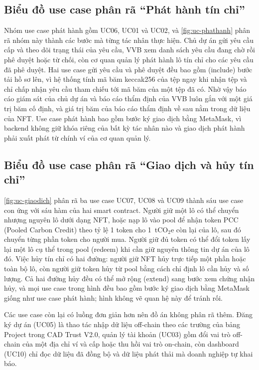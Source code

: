 \FloatBarrier
\subsection*{Biểu đồ use case phân rã ``Phát hành tín chỉ''}
\label{subsec:uc-phathanh}

Nhóm use case phát hành gồm UC06, UC01 và UC02, và \autoref{fig:uc-phathanh} phân rã nhóm này thành các bước mà từng tác nhân thực hiện. Chủ dự án gửi yêu cầu cấp và theo dõi trạng thái của yêu cầu, VVB xem danh sách yêu cầu đang chờ rồi phê duyệt hoặc từ chối, còn cơ quan quản lý phát hành lô tín chỉ cho các yêu cầu đã phê duyệt. Hai use case gửi yêu cầu và phê duyệt đều bao gồm (include) bước tải hồ sơ lên, vì hệ thống tính mã băm keccak256 của tệp ngay khi nhận tệp và chỉ chấp nhận yêu cầu tham chiếu tới mã băm của một tệp đã có. Nhờ vậy báo cáo giám sát của chủ dự án và báo cáo thẩm định của VVB luôn gắn với một giá trị băm cố định, và giá trị băm của báo cáo thẩm định về sau nằm trong dữ liệu của NFT. Use case phát hành bao gồm bước ký giao dịch bằng MetaMask, vì backend không giữ khóa riêng của bất kỳ tác nhân nào và giao dịch phát hành phải xuất phát từ chính ví của cơ quan quản lý.

\HinhUCPhatHanh

\subsection*{Biểu đồ use case phân rã ``Giao dịch và hủy tín chỉ''}
\label{subsec:uc-giaodich}

\autoref{fig:uc-giaodich} phân rã ba use case UC07, UC08 và UC09 thành sáu use case con ứng với sáu hàm của hai smart contract. Người giữ một lô có thể chuyển nhượng nguyên lô dưới dạng NFT, hoặc nạp lô vào pool để nhận token PCC (Pooled Carbon Credit) theo tỷ lệ 1 token cho 1~tCO$_2$e còn lại của lô, sau đó chuyển từng phần token cho người mua. Người giữ đủ token có thể đổi token lấy lại một lô cụ thể trong pool (redeem) khi cần giữ nguyên thông tin dự án của lô đó. Việc hủy tín chỉ có hai đường: người giữ NFT hủy trực tiếp một phần hoặc toàn bộ lô, còn người giữ token hủy từ pool bằng cách chỉ định lô cần hủy và số lượng. Cả hai đường hủy đều có thể mở rộng (extend) sang bước xem chứng nhận hủy, và mọi use case trong hình đều bao gồm bước ký giao dịch bằng MetaMask giống như use case phát hành; hình không vẽ quan hệ này để tránh rối.

\HinhUCGiaoDich

Các use case còn lại có luồng đơn giản hơn nên đồ án không phân rã thêm. Đăng ký dự án (UC05) là thao tác nhập dữ liệu off-chain theo các trường của bảng Project trong CAD Trust V2.0, quản lý tài khoản (UC03) gồm đổi vai trò off-chain của một địa chỉ ví và cấp hoặc thu hồi vai trò on-chain, còn dashboard (UC10) chỉ đọc dữ liệu đã đồng bộ và dữ liệu phát thải mà doanh nghiệp tự khai báo.

